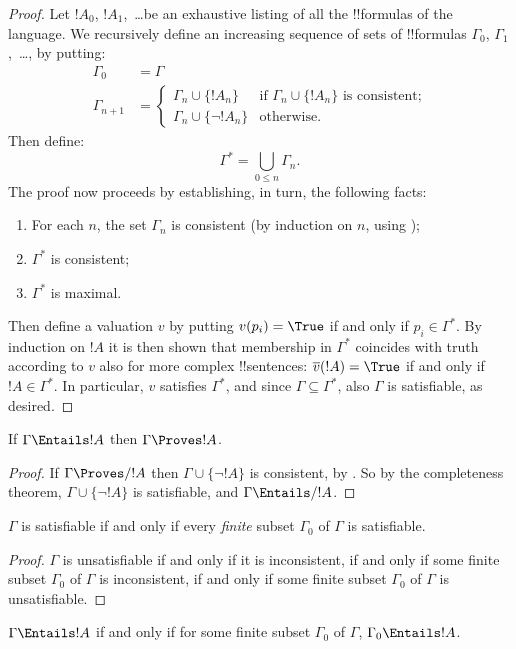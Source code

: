 \documentclass[../../../include/open-logic-section]{subfiles}
\begin{document}
\begin{proof}
Let $!A_0$, $!A_1$,~\dots be an exhaustive listing of all the
!!{formula}s of the language. We recursively define an increasing
sequence of sets of !!{formula}s $\Gamma_0$, $\Gamma_1$,~\dots, by
putting:
\begin{align*}
\Gamma_0 & = \Gamma\\
\Gamma_{n+1} &  =
\begin{cases}
  \Gamma_n \cup \{!A_n\} & \text{if $\Gamma_n \cup \{!A_n\}$ is
    consistent;}\\
  \Gamma_n \cup \{\lnot !A_n\} & \text{otherwise}.
\end{cases}
\end{align*}
Then define:
\[
\Gamma^* = \bigcup_{0\le n}\Gamma_n.
\]
The proof now proceeds by establishing, in turn, the following
facts:
\begin{enumerate}
\item For each $n$, the set $\Gamma_n$ is consistent (by induction on
  $n$, using );
\item $\Gamma^*$ is consistent;
\item $\Gamma^*$ is maximal.
\end{enumerate}
Then define a valuation $v$ by putting $v(p_i) = \True$ if and
only if $p_i \in \Gamma^*$. By induction on $!A$ it is then shown that
membership in $\Gamma^*$ coincides with truth according to $v$ also
for more complex !!{sentence}s: $\overline{v}(!A) = \True$ if and
only if $!A \in \Gamma^*$. In particular, $v$ satisfies $\Gamma^*$, and
since $\Gamma \subseteq \Gamma^*$, also $\Gamma$ is satisfiable, as
desired.
\end{proof}

\begin{cor}
If $\Gamma \Entails !A$ then $\Gamma \Proves !A$.
\end{cor}

\begin{proof}
If $\Gamma\Proves/ !A$ then $\Gamma \cup \{\lnot !A\}$ is consistent,
by . So by the completeness theorem, $\Gamma \cup
\{\lnot !A\}$ is satisfiable, and $\Gamma \Entails/ !A$.
\end{proof}

\begin{prop}
$\Gamma$ is satisfiable if and only if every \emph{finite} subset
$\Gamma_0$ of $\Gamma$ is satisfiable.
\end{prop}

\begin{proof}
$\Gamma$ is unsatisfiable if and only if it is inconsistent, if and
  only if some finite subset $\Gamma_0$ of $\Gamma$ is inconsistent,
  if and only if some finite subset $\Gamma_0$ of $\Gamma$ is
  unsatisfiable.
\end{proof}

\begin{cor}
$\Gamma \Entails !A$ if and only if for some finite subset
$\Gamma_0$ of $\Gamma$, $\Gamma_0 \Entails !A$.
\end{cor}
\end{document}
